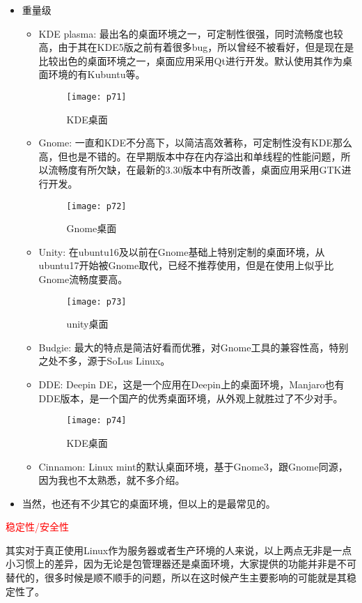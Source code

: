 \documentclass[utf8]{book}
\begin{document}
\begin{itemize}
	\item 重量级
		\begin{itemize}
			\item KDE plasma: 最出名的桌面环境之一，可定制性很强，同时流畅度也较高，由于其在KDE5版之前有着很多bug，所以曾经不被看好，但是现在是比较出色的桌面环境之一，桌面应用采用Qt进行开发。默认使用其作为桌面环境的有Kubuntu等。
			\begin{figure}[H]
				\centering
				\texttt{[image: p71]}
				\caption{KDE桌面}
			\end{figure}
			\item Gnome: 一直和KDE不分高下，以简洁高效著称，可定制性没有KDE那么高，但也是不错的。在早期版本中存在内存溢出和单线程的性能问题，所以流畅度有所欠缺，在最新的3.30版本中有所改善，桌面应用采用GTK进行开发。
			\begin{figure}[H]
				\centering
				\texttt{[image: p72]}
				\caption{Gnome桌面}
			\end{figure}
			\item Unity:   在ubuntu16及以前在Gnome基础上特别定制的桌面环境，从ubuntu17开始被Gnome取代，已经不推荐使用，但是在使用上似乎比Gnome流畅度要高。
			\begin{figure}[H]
				\centering
				\texttt{[image: p73]}
				\caption{unity桌面}
			\end{figure}
			\item Budgie:    最大的特点是简洁好看而优雅，对Gnome工具的兼容性高，特别之处不多，源于SoLus Linux。
			\item DDE:      Deepin DE，这是一个应用在Deepin上的桌面环境，Manjaro也有DDE版本，是一个国产的优秀桌面环境，从外观上就胜过了不少对手。
			\begin{figure}[H]
				\centering
				\texttt{[image: p74]}
				\caption{KDE桌面}
			\end{figure}
			\item Cinnamon:     Linux mint的默认桌面环境，基于Gnome3，跟Gnome同源，因为我也不太熟悉，就不多介绍。
			
		\end{itemize}	
	\item 当然，也还有不少其它的桌面环境，但以上的是最常见的。
	\end{itemize}

	\begin{center}
	{\LARGE \textcolor{red}{稳定性/安全性}}
	\end{center}
	其实对于真正使用Linux作为服务器或者生产环境的人来说，以上两点无非是一点小习惯上的差异，因为无论是包管理器还是桌面环境，大家提供的功能并非是不可替代的，很多时候是顺不顺手的问题，所以在这时候产生主要影响的可能就是其稳定性了。
	
\end{document}
